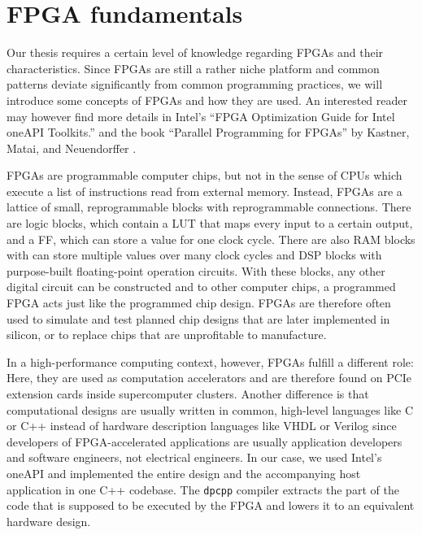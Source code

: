 \begin{example}
    \begin{center}
    \end{center}
\end{example}

\section{FPGA fundamentals}

Our thesis requires a certain level of knowledge regarding \acp{FPGA} and their characteristics. Since \acp{FPGA} are still a rather niche platform and common patterns deviate significantly from common programming practices, we will introduce some concepts of \acp{FPGA} and how they are used. An interested reader may however find more details in Intel's ``\ac{FPGA} Optimization Guide for Intel oneAPI Toolkits.'' and the book ``Parallel Programming for \acp{FPGA}'' by Kastner, Matai, and Neuendorffer \cite{2018arXiv180503648K}.

\acfp{FPGA} are programmable computer chips, but not in the sense of \acp{CPU} which execute a list of instructions read from external memory. Instead, \acp{FPGA} are a lattice of small, reprogrammable blocks with reprogrammable connections. There are logic blocks, which contain a \acf{LUT} that maps every input to a certain output, and a \acf{FF}, which can store a value for one clock cycle. There are also \acf{RAM} blocks with can store multiple values over many clock cycles and \ac{DSP} blocks with purpose-built floating-point operation circuits. With these blocks, any other digital circuit can be constructed and to other computer chips, a programmed \ac{FPGA} acts just like the programmed chip design. \acp{FPGA} are therefore often used to simulate and test planned chip designs that are later implemented in silicon, or to replace chips that are unprofitable to manufacture.

In a high-performance computing context, however, \acp{FPGA} fulfill a different role: Here, they are used as computation accelerators and are therefore found on PCIe extension cards inside supercomputer clusters. Another difference is that computational designs are usually written in common, high-level languages like C or C++ instead of hardware description languages like VHDL or Verilog since developers of \ac{FPGA}-accelerated applications are usually application developers and software engineers, not electrical engineers. In our case, we used Intel's oneAPI and implemented the entire design and the accompanying host application in one C++ codebase. The \texttt{dpcpp} compiler extracts the part of the code that is supposed to be executed by the \ac{FPGA} and lowers it to an equivalent hardware design. 

